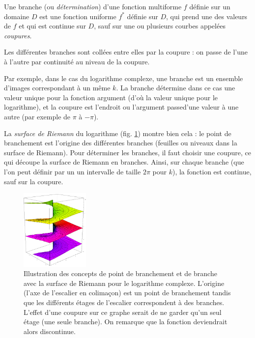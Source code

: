 \begin{mydef}[Branche]
    Une branche (ou \emph{détermination}) d'une fonction
    multiforme $f$ définie sur un domaine $D$
    est une fonction uniforme $f^*$ définie sur $D$, qui prend une des valeurs
    de $f$ et qui est continue sur $D$, sauf sur une ou plusieurs courbes
    appelées \emph{coupures}.
\end{mydef}

Les différentes branches sont \og collées \fg entre elles par la coupure :
on \og passe \fg de l'une à l'autre par \og continuité \fg au niveau de la
coupure.

Par exemple, dans le cas du logarithme complexe,
une branche est un ensemble d'images correspondant à un même $k$.
La branche détermine dans ce cas une valeur unique pour la fonction argument
(d'où la valeur unique pour le logarithme), et la coupure est l'endroit ou
l'argument \og passe\fg d'une valeur à une autre (par exemple de $\pi$ à $-\pi$).

La \emph{surface de Riemann} du logarithme (fig. \ref{fig:riemann-log})
montre bien cela : le point de branchement est \og l'origine \fg des différentes
branches (\og feuilles \fg ou \og niveaux \fg dans la surface de Riemann).
Pour déterminer les branches, il faut choisir une coupure, ce qui découpe la surface
de Riemann en branches. Ainsi, sur chaque branche (que l'on peut définir par un
un intervalle de taille $2\pi$ pour $k$), la fonction est continue, sauf sur la coupure.

\begin{figure}
	\centering
		\includegraphics[width=0.3\textwidth]{riemann_surface_log.jpg}
		\caption{Illustration des concepts de point de branchement et
		de branche avec la surface de Riemann pour le logarithme complexe.
		L'origine (l'axe de l'escalier en colimaçon) est un point de branchement
		tandis que les différents étages de l'escalier correspondent à des branches.
		L'effet d'une coupure sur ce graphe serait de ne garder qu'un seul étage
		(une seule branche). On remarque que la fonction deviendrait alors discontinue.}
		\label{fig:riemann-log}
\end{figure}

